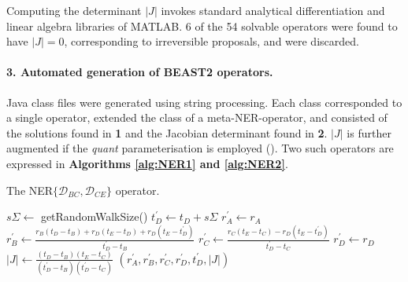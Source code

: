 \documentclass[10pt,letterpaper]{article}
\begin{document}
Computing the determinant $|J|$ invokes standard analytical differentiation and linear algebra libraries of MATLAB. 
6 of the 54 solvable operators were found to have $|J|=0$, corresponding to irreversible proposals, and were discarded. 


\paragraph{3. Automated generation of BEAST2 operators.} Java class files were generated using string processing. 
Each class corresponded to a single operator, extended the class of a meta-NER-operator, and consisted of the solutions found in \textbf{1} and the Jacobian determinant found in \textbf{2}. 
$|J|$ is further augmented if the \textit{quant} parameterisation is employed (\textbf{}).
Two such operators are expressed in \textbf{Algorithms \ref{alg:NER1} and \ref{alg:NER2}}.



\begin{algorithm}
\caption{The NER$\{ \mathcal{D}_{BC}, \mathcal{D}_{CE} \}$ operator.}
\begin{algorithmic}[1]


	\State
    \State $s\Sigma \leftarrow $ getRandomWalkSize() 
    \State $t_D^\prime \leftarrow t_D + s\Sigma$ 
    \State
    \State $r_A^\prime \leftarrow r_A$ 
    \State $r_B^\prime \leftarrow \frac{r_B(t_D - t_B) + r_D(t_E - t_D) + r_D(t_E - t_D^\prime)}{t_D^\prime - t_B}$
    \State $r_C^\prime \leftarrow \frac{r_C(t_E - t_C) - r_D(t_E - t_D^\prime)}{t_D^\prime - t_C}$
    \State $r_D^\prime \leftarrow r_D$
    \State
    \State $|J| \leftarrow \frac{(t_D - t_B)(t_E - t_C)}{(t_D^\prime - t_B)(t_D^\prime - t_C)}$ 
    \State \Return $(r_A^\prime, r_B^\prime, r_C^\prime, r_D^\prime, t_D^\prime, |J|)$
    
\EndProcedure

\end{algorithmic}
\label{alg:NER1}
\end{algorithm}
\end{document}
